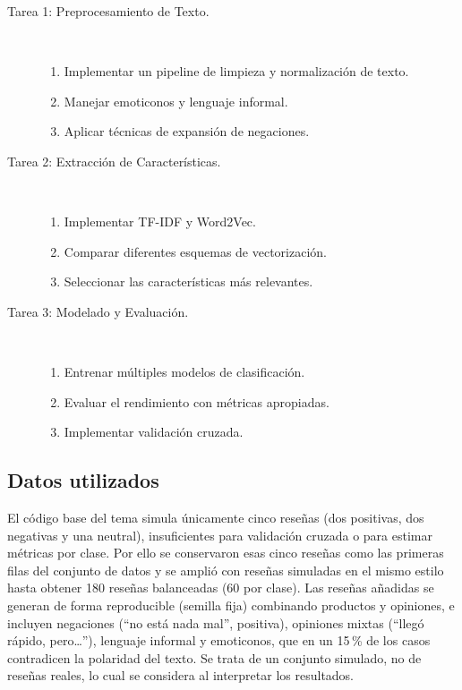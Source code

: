\documentclass[11pt,letterpaper]{article}
\begin{document}
\begin{description}
    \item[Tarea 1: Preprocesamiento de Texto.]\mbox{}\\[-1.3\baselineskip]
    \begin{enumerate}
        \item Implementar un pipeline de limpieza y normalización de texto.
        \item Manejar emoticonos y lenguaje informal.
        \item Aplicar técnicas de expansión de negaciones.
    \end{enumerate}
    \item[Tarea 2: Extracción de Características.]\mbox{}\\[-1.3\baselineskip]
    \begin{enumerate}
        \item Implementar TF-IDF y Word2Vec.
        \item Comparar diferentes esquemas de vectorización.
        \item Seleccionar las características más relevantes.
    \end{enumerate}
    \item[Tarea 3: Modelado y Evaluación.]\mbox{}\\[-1.3\baselineskip]
    \begin{enumerate}
        \item Entrenar múltiples modelos de clasificación.
        \item Evaluar el rendimiento con métricas apropiadas.
        \item Implementar validación cruzada.
    \end{enumerate}
\end{description}

\subsection*{Datos utilizados}

El código base del tema simula únicamente cinco reseñas (dos positivas, dos negativas y una neutral), insuficientes para validación cruzada o para estimar métricas por clase. Por ello se conservaron esas cinco reseñas como las primeras filas del conjunto de datos y se amplió con reseñas simuladas en el mismo estilo hasta obtener 180 reseñas balanceadas (60 por clase). Las reseñas añadidas se generan de forma reproducible (semilla fija) combinando productos y opiniones, e incluyen negaciones (``no está nada mal'', positiva), opiniones mixtas (``llegó rápido, pero\ldots ''), lenguaje informal y emoticonos, que en un 15\,\% de los casos contradicen la polaridad del texto. Se trata de un conjunto simulado, no de reseñas reales, lo cual se considera al interpretar los resultados.
\end{document}
